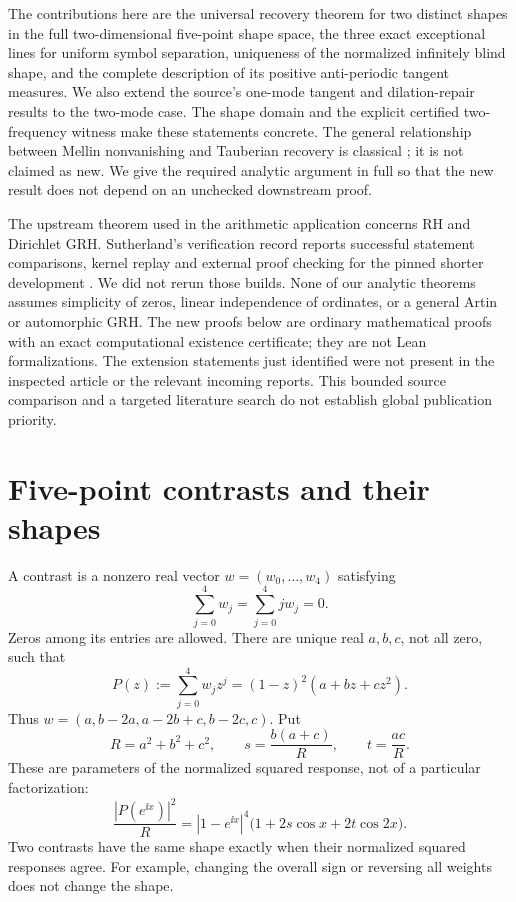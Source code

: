 \documentclass[11pt]{article}
\theoremstyle{definition}\newtheorem{definition}[theorem]{Definition}
\theoremstyle{remark}\newtheorem{remark}[theorem]{Remark}
\begin{document}
The contributions here are the universal recovery theorem for two distinct shapes in the
full two-dimensional five-point shape space, the three exact exceptional lines for uniform
symbol separation, uniqueness of the normalized infinitely blind shape, and the complete
description of its positive anti-periodic tangent measures. We also extend the source's
one-mode tangent and dilation-repair results to the two-mode case. The shape domain and
the explicit certified two-frequency witness make these statements concrete.
The general relationship between Mellin nonvanishing and Tauberian recovery is classical
\cite{Wiener,BinghamInoue}; it is not claimed as new. We give the required analytic argument
in full so that the new result does not depend on an unchecked downstream proof.

The upstream theorem used in the arithmetic application concerns RH and Dirichlet GRH.
Sutherland's verification record reports successful statement comparisons, kernel replay and
external proof checking for the pinned shorter development \cite{Sutherland}. We did not rerun
those builds. None of our analytic theorems assumes simplicity of zeros, linear independence
of ordinates, or a general Artin or automorphic GRH. The new proofs below are ordinary
mathematical proofs with an exact computational existence certificate; they are not Lean
formalizations. The extension statements just identified were not present in the inspected
article or the relevant incoming reports. This bounded source comparison and a targeted
literature search do not establish global publication priority.

\section{Five-point contrasts and their shapes}

A contrast is a nonzero real vector $w=(w_0,\ldots,w_4)$ satisfying
\begin{equation}\label{eq:moments}
 \sum_{j=0}^4w_j=\sum_{j=0}^4j w_j=0.
\end{equation}
Zeros among its entries are allowed. There are unique real $a,b,c$, not all zero, such that
\begin{equation}\label{eq:factor}
 P(z):=\sum_{j=0}^4w_jz^j=(1-z)^2(a+bz+cz^2).
\end{equation}
Thus $w=(a,b-2a,a-2b+c,b-2c,c)$. Put
\begin{equation}\label{eq:shape}
 R=a^2+b^2+c^2,\qquad s=\frac{b(a+c)}R,\qquad t=\frac{ac}R.
\end{equation}
These are parameters of the normalized squared response, not of a particular factorization:
\begin{equation}\label{eq:response}
 \frac{|P(e^{\ii x})|^2}R
 =|1-e^{\ii x}|^4\bigl(1+2s\cos x+2t\cos2x\bigr).
\end{equation}
Two contrasts have the same shape exactly when their normalized squared responses agree.
For example, changing the overall sign or reversing all weights does not change the shape.
\end{document}
